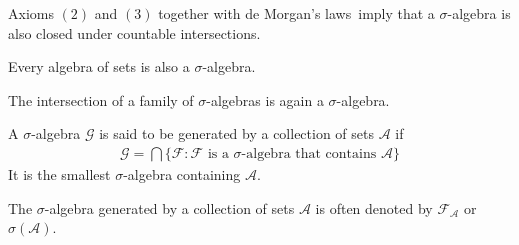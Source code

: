	\begin{remark}
    		Axioms $(2)$ and $(3)$ together with de Morgan's laws\footnotemark\ imply that a $\sigma$-algebra is also closed under countable intersections.
	\end{remark}
	
	\begin{result}
		Every algebra of sets is also a $\sigma$-algebra.
	\end{result}
    
	\begin{property}
		The intersection of a family of $\sigma$-algebras is again a $\sigma$-algebra.
	\end{property}
    
	\begin{definition}
		A $\sigma$-algebra $\mathcal{G}$ is said to be generated by a collection of sets $\mathcal{A}$ if
        	\begin{gather}
			\label{set:generated_sigma_algebra}
        		\mathcal{G} = \bigcap\{\mathcal{F}:\mathcal{F} \text{ is a } \sigma\text{-algebra that contains } \mathcal{A}\}
		\end{gather}
	        It is the smallest $\sigma$-algebra containing $\mathcal{A}$.
	\end{definition}
	\begin{notation}\label{set:notation:generated_sigma_algebra}
		The $\sigma$-algebra generated by a collection of sets $\mathcal{A}$ is often denoted by $\mathcal{F}_\mathcal{A}$ or $\sigma(\mathcal{A})$.
	\end{notation}
    

